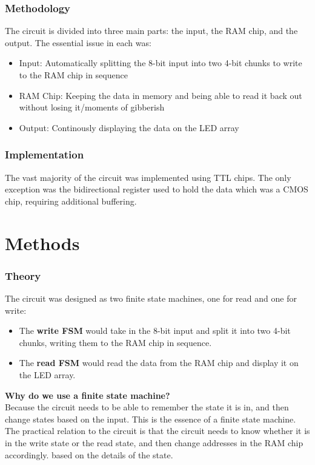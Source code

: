 \documentclass{article}
\begin{document}
        \subsubsection{Methodology}

        The circuit is divided into three main parts: the input, the RAM chip, and the output.
        The essential issue in each was:
        \begin{itemize}
            \item Input: Automatically splitting the 8-bit input into two 4-bit chunks to write to the RAM chip in sequence 
            \item RAM Chip: Keeping the data in memory and being able to read it back out without losing it/moments of gibberish
            \item Output: Continously displaying the data on the LED array
        \end{itemize}
        \subsubsection{Implementation}
        The vast majority of the circuit was implemented using TTL chips. The only exception was the bidirectional register used to hold the data which was a CMOS chip, requiring additional buffering.

    \section{Methods}
        \subsubsection{Theory}
        The circuit was designed as two finite state machines, one for read and one for write:
        \begin{itemize}
            \item The \textbf{write FSM} would take in the 8-bit input and split it into two 4-bit chunks, writing them to the RAM chip in sequence.
            \item The \textbf{read FSM} would read the data from the RAM chip and display it on the LED array.
        \end{itemize}
            
        \textbf{Why do we use a finite state machine?}\\ 
        
        Because the circuit needs to be able to remember the state it is in, and then change states based on the input. This is the essence of a finite state machine.
        The practical relation to the circuit is that the circuit needs to know whether it is in the write state or the read state, and then change addresses in the RAM chip accordingly.
        based on the details of the state. 
\end{document}

